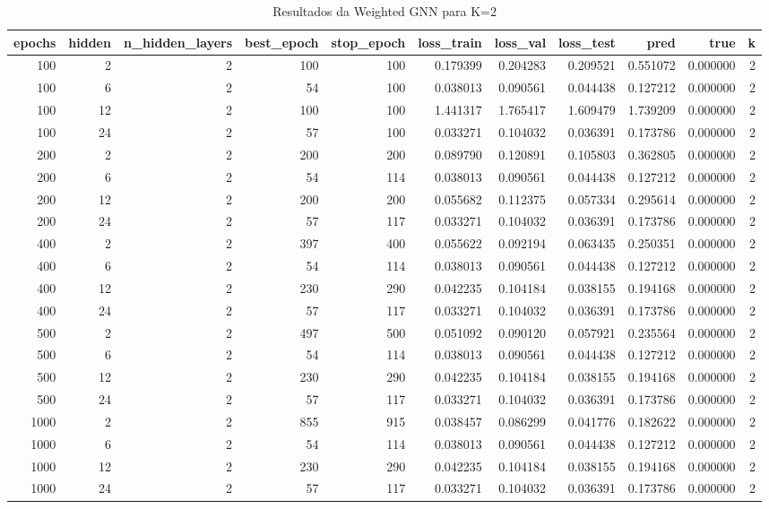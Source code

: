 \begin{table}
\caption{Resultados da Weighted GNN para K=2}
\label{tab:weighted_gnn_results_k2}
\begin{tabular}{rrrrrrrrrrr}
\toprule
epochs & hidden & n\_hidden\_layers & best\_epoch & stop\_epoch & loss\_train & loss\_val & loss\_test & pred & true & k \\
\midrule
100 & 2 & 2 & 100 & 100 & 0.179399 & 0.204283 & 0.209521 & 0.551072 & 0.000000 & 2 \\
100 & 6 & 2 & 54 & 100 & 0.038013 & 0.090561 & 0.044438 & 0.127212 & 0.000000 & 2 \\
100 & 12 & 2 & 100 & 100 & 1.441317 & 1.765417 & 1.609479 & 1.739209 & 0.000000 & 2 \\
100 & 24 & 2 & 57 & 100 & 0.033271 & 0.104032 & 0.036391 & 0.173786 & 0.000000 & 2 \\
200 & 2 & 2 & 200 & 200 & 0.089790 & 0.120891 & 0.105803 & 0.362805 & 0.000000 & 2 \\
200 & 6 & 2 & 54 & 114 & 0.038013 & 0.090561 & 0.044438 & 0.127212 & 0.000000 & 2 \\
200 & 12 & 2 & 200 & 200 & 0.055682 & 0.112375 & 0.057334 & 0.295614 & 0.000000 & 2 \\
200 & 24 & 2 & 57 & 117 & 0.033271 & 0.104032 & 0.036391 & 0.173786 & 0.000000 & 2 \\
400 & 2 & 2 & 397 & 400 & 0.055622 & 0.092194 & 0.063435 & 0.250351 & 0.000000 & 2 \\
400 & 6 & 2 & 54 & 114 & 0.038013 & 0.090561 & 0.044438 & 0.127212 & 0.000000 & 2 \\
400 & 12 & 2 & 230 & 290 & 0.042235 & 0.104184 & 0.038155 & 0.194168 & 0.000000 & 2 \\
400 & 24 & 2 & 57 & 117 & 0.033271 & 0.104032 & 0.036391 & 0.173786 & 0.000000 & 2 \\
500 & 2 & 2 & 497 & 500 & 0.051092 & 0.090120 & 0.057921 & 0.235564 & 0.000000 & 2 \\
500 & 6 & 2 & 54 & 114 & 0.038013 & 0.090561 & 0.044438 & 0.127212 & 0.000000 & 2 \\
500 & 12 & 2 & 230 & 290 & 0.042235 & 0.104184 & 0.038155 & 0.194168 & 0.000000 & 2 \\
500 & 24 & 2 & 57 & 117 & 0.033271 & 0.104032 & 0.036391 & 0.173786 & 0.000000 & 2 \\
1000 & 2 & 2 & 855 & 915 & 0.038457 & 0.086299 & 0.041776 & 0.182622 & 0.000000 & 2 \\
1000 & 6 & 2 & 54 & 114 & 0.038013 & 0.090561 & 0.044438 & 0.127212 & 0.000000 & 2 \\
1000 & 12 & 2 & 230 & 290 & 0.042235 & 0.104184 & 0.038155 & 0.194168 & 0.000000 & 2 \\
1000 & 24 & 2 & 57 & 117 & 0.033271 & 0.104032 & 0.036391 & 0.173786 & 0.000000 & 2 \\
\bottomrule
\end{tabular}
\end{table}
